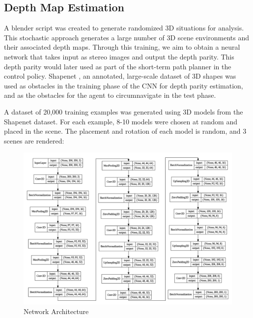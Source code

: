 \subsection{Depth Map Estimation}
A blender script was created to generate randomized 3D situations for analysis. This stochastic approach generates a large number of 3D scene environments and their associated depth maps.
Through this training, we aim to obtain a neural network that takes input as stereo images and output the depth parity. This depth parity would later used as part of the short-term path planner in the control policy.
Shapenet \cite{shapenet2015}, an annotated, large-scale dataset of 3D shapes was used as obstacles in the training phase of the CNN for depth parity estimation, and as the obstacles for the agent to circumnavigate in the test phase.

A dataset of 20,000 training examples was generated using 3D models from the Shapenet dataset. For each example, 8-10 models were chosen at random and placed in the scene.
The placement and rotation of each model is random, and 3 scenes are rendered:

\begin{figure}[!htb]
\includegraphics[width=\linewidth]{images/network.png}
\caption{Network Architecture}
\label{fig:network}
\end{figure}

